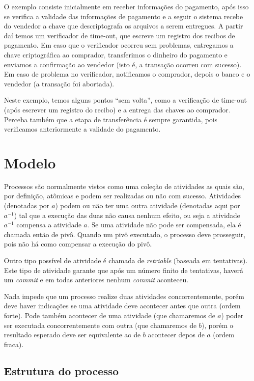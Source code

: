 \documentclass[a4paper,12pt,notitlepage]{article}
\begin{document}
O exemplo consiste inicialmente em receber informações do pagamento, após isso
se verifica a validade das informações de pagamento e a seguir o sistema recebe do vendedor a chave que descriptografa os arquivos a serem entregues. 
A partir daí temos um verificador de time-out, que escreve um registro dos recibos de pagamento. Em caso que o verificador ocorreu sem problemas, entregamos a chave criptográfica ao comprador, transferimos o dinheiro do pagamento e enviamos a confirmação ao vendedor (isto é, a transação ocorreu com sucesso). Em caso de problema no verificador, notificamos o comprador, depois o banco e o vendedor (a transação foi abortada). 

Neste exemplo, temos alguns pontos ``sem volta'', como a verificação de time-out (após escrever um registro do recibo) e a entrega das chaves ao comprador. Perceba também que a etapa de transferência é sempre garantida, pois verificamos anteriormente a validade do pagamento. 

\newpage

\section{Modelo}

Processos são normalmente vistos como uma coleção de atividades as quais são, por definição, atômicas e podem ser realizadas ou não com sucesso. Atividades (denotadas por $a$) podem ou não ter uma outra atividade (denotadas aqui por $a^{-1}$) tal que a execução das duas não causa nenhum efeito, ou seja a atividade $a^{-1}$ compensa a atividade $a$. Se uma atividade não pode
ser compensada, ela é chamada então de pivô. Quando um pivô executado, o processo deve prosseguir, pois não há como compensar a execução do pivô.

Outro tipo possível de atividade é chamada de \textit{retriable} (baseada em tentativas). Este tipo de atividade garante que após um número finito de tentativas, haverá um \textit{commit} e em todas anteriores nenhum \textit{commit} aconteceu.

Nada impede que um processo realize duas atividades concorrentemente, porém deve haver indicações se uma atividade deve acontecer antes que outra (ordem forte). Pode também acontecer de uma atividade (que chamaremos de $a$) poder ser executada concorrentemente com outra (que chamaremos de $b$), porém o resultado esperado deve ser equivalente ao de $b$ acontecer depos de $a$ (ordem fraca).

\subsection{Estrutura do processo}
\end{document}
